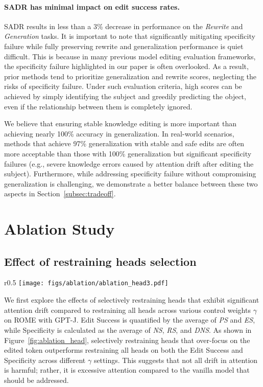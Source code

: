 \paragraph{SADR has minimal impact on edit success rates.} SADR results in less than a 3\% decrease in performance on the \textit{Rewrite} and \textit{Generation} tasks. 
It is important to note that significantly mitigating specificity failure while fully preserving rewrite and generalization performance is quiet difficult. 
This is because in many previous model editing evaluation frameworks, the specificity failure highlighted in our paper is often overlooked. 
As a result, prior methods tend to prioritize generalization and rewrite scores, neglecting the risks of specificity failure. 
Under such evaluation criteria, high scores can be achieved by simply identifying the subject and greedily predicting the object, even if the relationship between them is completely ignored.

We believe that ensuring stable knowledge editing is more important than achieving nearly 100\% accuracy in generalization. 
In real-world scenarios, methods that achieve 97\% generalization with stable and safe edits are often more acceptable than those with 100\% generalization but significant specificity failures (e.g., severe knowledge errors caused by attention drift after editing the subject). 
Furthermore, while addressing specificity failure without compromising generalization is challenging, we demonstrate a better balance between these two aspects in Section~\ref{subsec:tradeoff}.

\section{Ablation Study}
\label{sec:ablation}

\subsection{Effect of restraining heads selection}
\begin{wrapfigure}{r}{0.5\textwidth}
    \vspace{-15pt}
    \texttt{[image: figs/ablation/ablation\_head3.pdf]}
    \caption{Impact of selective head restriction on Edit Success and Specificity performance}
    \label{fig:ablation_head}
    \vspace{-10pt}
\end{wrapfigure}
We first explore the effects of selectively restraining heads that exhibit significant attention drift compared to restraining all heads across various control weights $\gamma$ on ROME with GPT-J. 
Edit Success is quantified by the average of \textit{PS} and \textit{ES}, while Specificity is calculated as the average of \textit{NS}, \textit{RS}, and \textit{DNS}.
As shown in Figure~\ref{fig:ablation_head}, selectively restraining heads that over-focus on the edited token outperforms restraining all heads on both the Edit Success and Specificity across different $\gamma$ settings. 
This suggests that not all drift in attention is harmful; rather, it is excessive attention compared to the vanilla model that should be addressed.

